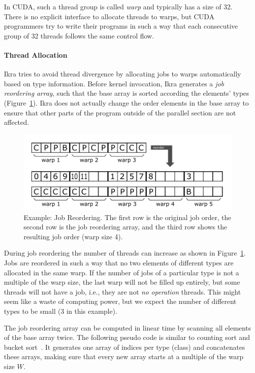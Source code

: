 \documentclass[preprint]{sigplanconf}
\begin{document}
In CUDA, such a thread group is called \emph{warp} and typically has a size of 32. There is no explicit interface to allocate threads to warps, but CUDA programmers try to write their programs in such a way that each consecutive group of 32 threads follows the same control flow.

\paragraph{Thread Allocation}
Ikra tries to avoid thread divergence by allocating jobs to warps automatically based on type information. Before kernel invocation, Ikra generates a \emph{job reordering array}, such that the base array is sorted according the elements' types (Figure~\ref{fig:ex_job_reorder}). Ikra does not actually change the order elements in the base array to ensure that other parts of the program outside of the parallel section are not affected.

\begin{figure}[!htp]
    \centering
    \includegraphics[width=\columnwidth]{reorder_example.pdf}
    \caption{Example: Job Reordering. The first row is the original job order, the second row is the job reordering array, and the third row shows the resulting job order (warp size 4).}
    \label{fig:ex_job_reorder}
\end{figure}

During job reordering the number of threads can increase as shown in Figure~\ref{fig:ex_job_reorder}. Jobs are reordered in such a way that no two elements of different types are allocated in the same warp. If the number of jobs of a particular type is not a multiple of the warp size, the last warp will not be filled up entirely, but some threads will not have a job, i.e., they are not \emph{no operation} threads. This might seem like a waste of computing power, but we expect the number of different types to be small (3 in this example).

The job reordering array can be computed in linear time by scanning all elements of the base array twice. The following pseudo code is similar to counting sort and bucket sort~\cite{Corwin:2004:SLT:1040231.1040257}. It generates one array of indices per type (class) and concatenates these arrays, making sure that every new array starts at a multiple of the warp size $W$.
\end{document}

